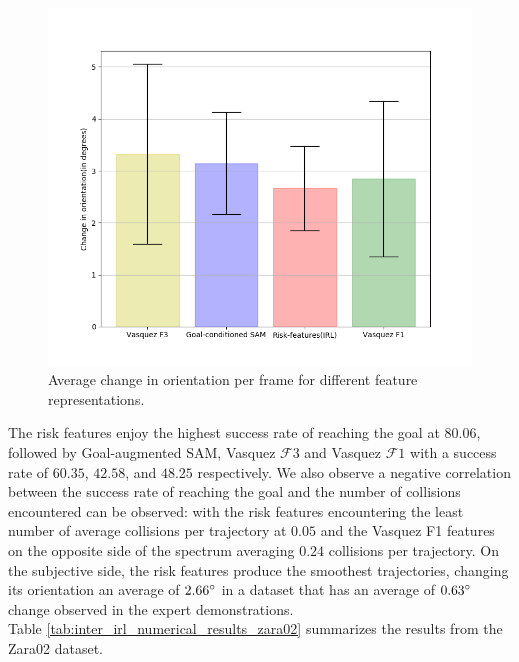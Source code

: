 \begin{figure}[htbp]
	\includegraphics[width=.95\linewidth]{plots/plot_without_outliers/zara02_inter_irl_no_outlier/compute_trajectory_smoothness_zara02_no_outlier_inter_irl_traj_5.png}
	\caption{Average change in orientation per frame for different feature representations.}
	\label{fig:inter_irl-trajectory_smoothness-zara02}
\end{figure}

 The risk features enjoy the highest success rate of reaching the goal at $80.06$, followed by Goal-augmented SAM, Vasquez $\mathcal{F}3$ and Vasquez $\mathcal{F}1$ with a success rate of $60.35$, $42.58$, and $48.25$ respectively.  We also observe a negative correlation between the success rate of reaching the goal and the number of collisions encountered can be observed: with the risk features encountering the least number of average collisions per trajectory at $0.05$ and the Vasquez F1 features on the opposite side of the spectrum averaging $0.24$ collisions per trajectory.  
On the subjective side, the risk features produce the smoothest trajectories, changing its orientation an average of $2.66\degree$ in a dataset that has an average of $0.63\degree$ change observed in the expert demonstrations.\\
Table \autoref{tab:inter_irl_numerical_results_zara02} summarizes the results from the Zara02 dataset.

